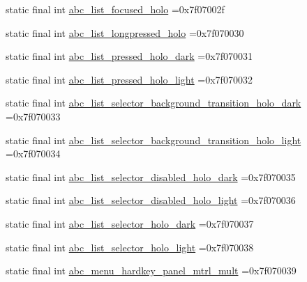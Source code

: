 \begin{DoxyCompactItemize}
\item 
static final int \mbox{\hyperlink{classbr_1_1unb_1_1cic_1_1mp_1_1marketmaster_1_1test_1_1R_1_1drawable_a020d240fc93a6cf023d39b462934b623}{abc\+\_\+list\+\_\+focused\+\_\+holo}} =0x7f07002f
\item 
static final int \mbox{\hyperlink{classbr_1_1unb_1_1cic_1_1mp_1_1marketmaster_1_1test_1_1R_1_1drawable_a27b4a225e1b3a14e7cc207f622425107}{abc\+\_\+list\+\_\+longpressed\+\_\+holo}} =0x7f070030
\item 
static final int \mbox{\hyperlink{classbr_1_1unb_1_1cic_1_1mp_1_1marketmaster_1_1test_1_1R_1_1drawable_acb52f37b5dd301f3d91aa0ef6d2b57b4}{abc\+\_\+list\+\_\+pressed\+\_\+holo\+\_\+dark}} =0x7f070031
\item 
static final int \mbox{\hyperlink{classbr_1_1unb_1_1cic_1_1mp_1_1marketmaster_1_1test_1_1R_1_1drawable_a7bb6079d405a0333ece9539033803680}{abc\+\_\+list\+\_\+pressed\+\_\+holo\+\_\+light}} =0x7f070032
\item 
static final int \mbox{\hyperlink{classbr_1_1unb_1_1cic_1_1mp_1_1marketmaster_1_1test_1_1R_1_1drawable_a590136a34865f89e278694fd5ecdbdbc}{abc\+\_\+list\+\_\+selector\+\_\+background\+\_\+transition\+\_\+holo\+\_\+dark}} =0x7f070033
\item 
static final int \mbox{\hyperlink{classbr_1_1unb_1_1cic_1_1mp_1_1marketmaster_1_1test_1_1R_1_1drawable_a69d5d35e9587bafeb0108fc4187bbafe}{abc\+\_\+list\+\_\+selector\+\_\+background\+\_\+transition\+\_\+holo\+\_\+light}} =0x7f070034
\item 
static final int \mbox{\hyperlink{classbr_1_1unb_1_1cic_1_1mp_1_1marketmaster_1_1test_1_1R_1_1drawable_acdb5a47d0e17f56438290cfda0075d1b}{abc\+\_\+list\+\_\+selector\+\_\+disabled\+\_\+holo\+\_\+dark}} =0x7f070035
\item 
static final int \mbox{\hyperlink{classbr_1_1unb_1_1cic_1_1mp_1_1marketmaster_1_1test_1_1R_1_1drawable_a09e397209b8a0ad48b1ba48b48a1290a}{abc\+\_\+list\+\_\+selector\+\_\+disabled\+\_\+holo\+\_\+light}} =0x7f070036
\item 
static final int \mbox{\hyperlink{classbr_1_1unb_1_1cic_1_1mp_1_1marketmaster_1_1test_1_1R_1_1drawable_a1299ad0406dabc17660e8bf7fe26031d}{abc\+\_\+list\+\_\+selector\+\_\+holo\+\_\+dark}} =0x7f070037
\item 
static final int \mbox{\hyperlink{classbr_1_1unb_1_1cic_1_1mp_1_1marketmaster_1_1test_1_1R_1_1drawable_af9aa93717a82d6ea5e78ce2b83cfdcf8}{abc\+\_\+list\+\_\+selector\+\_\+holo\+\_\+light}} =0x7f070038
\item 
static final int \mbox{\hyperlink{classbr_1_1unb_1_1cic_1_1mp_1_1marketmaster_1_1test_1_1R_1_1drawable_a5c2033bb122c272f63b7994ed81331ac}{abc\+\_\+menu\+\_\+hardkey\+\_\+panel\+\_\+mtrl\+\_\+mult}} =0x7f070039

\end{DoxyCompactItemize}
